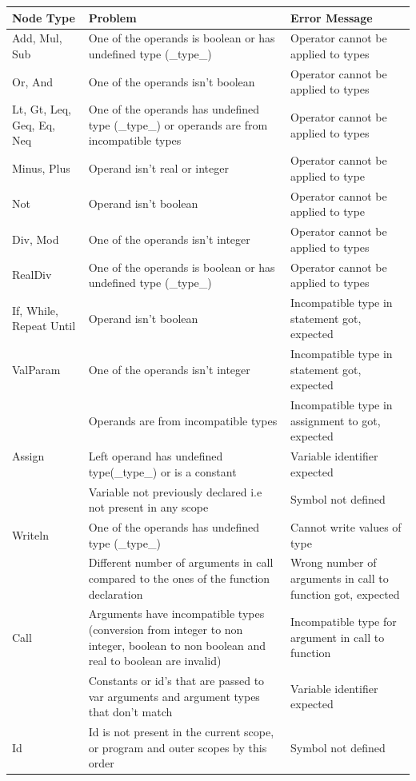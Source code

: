 \documentclass[12pt]{article}
\begin{document}
\begin{longtable} {|p{3.0cm} | p{8cm} | p{4.0cm}|} 
 \textbf{Node Type} 	& \textbf{Problem} & \textbf{Error Message} \\ \hline
	Add, Mul, Sub 		& One of the operands is boolean or has undefined type (\_type\_) & Operator cannot be applied to types \\ \hline
	Or, And 			& One of the operands isn't boolean & Operator cannot be applied to types \\ \hline
	Lt, Gt, Leq, Geq, Eq, Neq &		One of the operands has undefined type (\_type\_) or operands are from incompatible types & Operator cannot be applied to types \\ \hline
	Minus, Plus 		& Operand isn't real or integer & Operator cannot be applied to type \\ \hline
	Not 				& Operand isn't boolean & Operator cannot be applied to type \\ \hline
	Div, Mod 			& One of the operands isn't integer & Operator cannot be applied to types \\ \hline
	RealDiv				& One of the operands is boolean or has undefined type (\_type\_) & Operator cannot be applied to types \\ \hline
	If, While, Repeat Until & Operand isn't boolean & Incompatible type in statement got, expected \\ \hline
	ValParam 			& One of the operands isn't integer & Incompatible type in statement got, expected \\ \hline
	\multirow{3}{*}{Assign} & Operands are from incompatible types & Incompatible type in assignment to got, expected \\ \cline{2-3}
							& Left operand has undefined type(\_type\_) or is a constant & Variable identifier expected \\ \cline{2-3}
							& Variable not previously declared i.e not present in any scope & Symbol not defined \\ \hline
	Writeln 			& One of the operands has undefined type (\_type\_) & Cannot write values of type \\ \hline
	\multirow{3}{*}{Call} 	& Different number of arguments in call compared to the ones of the function declaration & Wrong number of arguments in call to function got, expected \\ \cline{2-3}
	 					& Arguments have incompatible types (conversion from integer to non integer, boolean to non boolean and real to boolean are invalid) & Incompatible type for argument in call to function  \\ \cline{2-3}
						& Constants or id's that are passed to var arguments and argument types that don't match & Variable identifier expected  \\ \hline
	Id 					& Id is not present in the current scope, or program and outer scopes by this order & Symbol not defined  \\ \hline

\end{longtable}
\end{document}

